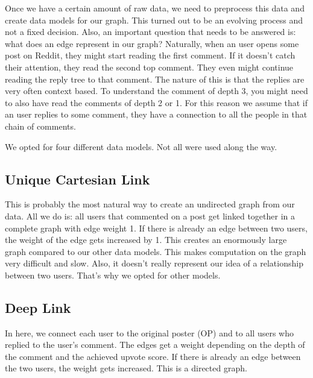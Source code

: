 Once we have a certain amount of raw data, we need to preprocess this data and create data models for our graph. This turned out to be an evolving process and not a fixed decision. Also, an important question that needs to be answered is: what does an edge represent in our graph? Naturally, when an user opens some post on Reddit, they might start reading the first comment. If it doesn't catch their attention, they read the second top comment. They even might continue reading the reply tree to that comment. The nature of this is that the replies are very often context based. To understand the comment of depth 3, you might need to also have read the comments of depth 2 or 1. For this reason we assume that if an user replies to some comment, they have a connection to all the people in that chain of comments. 

We opted for four different data models. Not all were used along the way.

\subsection{Unique Cartesian Link}
This is probably the most natural way to create an undirected graph from our data. All we do is: all users that commented on a post get linked together in a complete graph with edge weight 1. If there is already an edge between two users, the weight of the edge gets increased by 1. This creates an enormously large graph compared to our other data models. This makes computation on the graph very difficult and slow. Also, it doesn't really represent our idea of a relationship between two users. That's why we opted for other models.

\subsection{Deep Link}
In here, we connect each user to the original poster (OP) and to all users who replied to the user's comment. The edges get a weight depending on the depth of the comment and the achieved upvote score. If there is already an edge between the two users, the weight gets increased. This is a directed graph.





